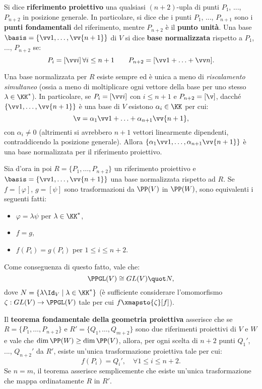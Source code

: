 \documentclass[10pt,landscape]{article}
\begin{document}
\begin{multicols}{3}
		
		
		Si dice \textbf{riferimento proiettivo} una qualsiasi $(n+2)$-upla di punti
		$P_1$, ..., $P_{n+2}$ in posizione generale. In particolare, si dice che i punti
		$P_1$, ..., $P_{n+1}$ sono i \textbf{punti fondamentali} del riferimento, mentre
		$P_{n+2}$ è il \textbf{punto unità}. Una base $\basis = \{\vv 1, \ldots, \vv{n+1}\}$
		di $V$ si dice \textbf{base normalizzata} rispetto a $P_1$, ..., $P_{n+2}$ se:
		\[ P_i = [\vv i] \, \forall i \leq n+1 \qquad P_{n+2} = [\vv 1 + \ldots + \vv n]. \]
		
		Una base normalizzata per $R$ esiste sempre ed
		è unica a meno di \textit{riscalamento simultaneo}
		(ossia a meno di moltiplicare ogni vettore della base per uno stesso $\lambda \in \KK^*$). In particolare, se $P_i = [\vv i]$ con $i \leq n+1$ e
		$P_{n+2} = [\v]$, dacché $\{\vv 1, \ldots, \vv {n+1}\}$ è una base di $V$
		esistono $\alpha_i \in \KK$ per cui:
		\[ \v = \alpha_1 \vv 1 + \ldots + \alpha_{n+1} \vv{n+1}, \]
		con $\alpha_i \neq 0$ (altrimenti si avrebbero $n+1$ vettori linearmente
		dipendenti, contraddicendo la posizione generale). Allora
		$\{\alpha_1 \vv 1, \ldots, \alpha_{n+1} \vv {n+1}\}$ è una base normalizzata
		per il riferimento proiettivo. \medskip
		
		
		Sia d'ora in poi $R = \{P_1, \ldots, P_{n+2}\}$ un riferimento proiettivo e
		$\basis = \{\vv 1, \ldots, \vv{n+1}\}$ una base normalizzata rispetto ad $R$.
		Se $f = [\varphi]$, $g = [\psi]$ sono trasformazioni da $\PP(V)$ in $\PP(W)$, sono equivalenti i seguenti fatti:
		
		\begin{itemize}
			\item $\varphi = \lambda \psi$ per $\lambda \in \KK^*$,
			\item $f = g$,
			\item $f(P_i) = g(P_i)$ per $1 \leq i \leq n+2$.
		\end{itemize}
		
		Come conseguenza di questo fatto, vale che:
		\[ \PPGL(V) \cong GL(V) \quot N, \]
		dove $N = \{ \lambda \Id_V \mid \lambda \in \KK^* \}$ (è sufficiente
		considerare l'omomorfismo $\zeta : GL(V) \to \PPGL(V)$ tale per cui
		$f \xmapsto{\zeta} [f]$).
		
		Il \textbf{teorema fondamentale della geometria proiettiva}
		asserisce che se $R = \{P_1, \ldots, P_{n+2}\}$ e $R' = \{Q_1, \ldots, Q_{m+2}\}$ sono
		due riferimenti proiettivi di $V$ e $W$ e vale che $\dim \PP(W) \geq \dim \PP(V)$,
		allora, per ogni scelta di $n+2$ punti $Q_1'$, ..., $Q_{n+2}'$ da $R'$, esiste
		un'unica trasformazione proiettiva tale per cui:
		\[ f(P_i) = Q_i', \quad \forall 1 \leq i \leq n+2. \]
		Se $n=m$, il teorema asserisce semplicemente che esiste un'unica trasformazione
		che mappa ordinatamente $R$ in $R'$. \medskip
		

\end{multicols}
\end{document}
